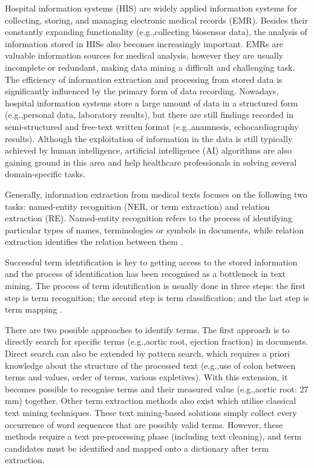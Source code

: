 Hospital information systems (HIS) are widely applied information systems for collecting, storing, and managing electronic medical records (EMR). Besides their constantly expanding functionality (e.g.,collecting biosensor data), the analysis of information stored in HISs also becomes increasingly important. EMRs are valuable information sources for medical analysis, however they are usually incomplete or redundant, making data mining a difficult and challenging task. The efficiency of information extraction and processing from stored data is significantly influenced by the primary form of data recording. Nowadays, hospital information systems store a large amount of data in a structured form (e.g.,personal data, laboratory results), but there are still findings recorded in semi-structured and free-text written format (e.g.,anamnesis, echocardiography results). Although the exploitation of information in the data is still typically achieved by human intelligence, artificial intelligence (AI) algorithms are also gaining ground in this area and help healthcare professionals in solving several domain-specific tasks.

Generally, information extraction from medical texts focuses on the following two tasks: named-entity recognition (NER, or term extraction) and relation extraction (RE). Named-entity recognition refers to the process of identifying particular types of names, terminologies or symbols in documents, while relation extraction identifies the relation between them \cite{sun2018data}.

Successful term identification is key to getting access to the stored information and the process of identification has been recognised as a bottleneck in text mining. The process of term identification is usually done in three steps: the first step is term recognition; the second step is term classification; and the last step is term mapping \cite{krauthammer2004term}.

There are two possible approaches to identify terms. The first approach is to directly search for specific terms (e.g.,aortic root, ejection fraction) in documents. Direct search can also be extended by pattern search, which requires a priori knowledge about the structure of the processed text (e.g.,use of colon between terms and values, order of terms, various expletives). With this extension, it becomes possible to recognise terms and their measured value (e.g.,aortic root: 27 mm) together. Other term extraction methods also exist which utilise classical text mining techniques. These text mining-based solutions simply collect every occurrence of word sequences that are possibly valid terms. However, these methods require a text pre-processing phase (including text cleaning), and term candidates must be identified and mapped onto a dictionary after term extraction.


